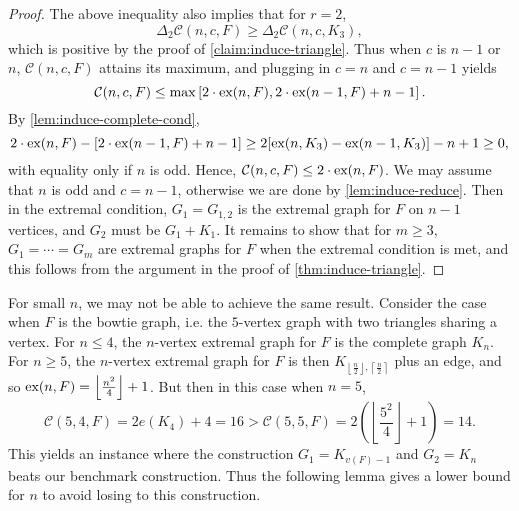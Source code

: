 \documentclass[12pt]{report}
\newtheorem{corollary}[theorem]{Corollary}
\newcommand*{\ex}{\textnormal{ex}}
\newcommand*{\dex}{\textnormal{ex}_2}
\newcommand*{\con}{\mathcal{C}}
\begin{document}
\begin{proof}
  The above inequality also implies that for $r = 2$,
  \[
    \Delta_2 \con(n, c, F) \geq \Delta_2 \con(n, c, K_3),
  \]
  which is positive by the proof of \cref{claim:induce-triangle}. Thus when $c$ is $n - 1$ or $n$, $\con(n, c, F)$ attains its maximum, and plugging in $c = n$ and $c = n -1$ yields 
  \[
    \con(n, c, F) \leq \max\left[2 \cdot \ex(n, F), 2 \cdot \ex(n - 1, F) + n - 1\right].
  \]
  By \cref{lem:induce-complete-cond},
  \[
    2 \cdot \ex(n, F) - [2 \cdot \ex(n - 1, F) + n - 1] \geq 2[\ex(n, K_{3}) - \ex(n - 1, K_{3})] - n + 1 \geq 0,
  \]
  with equality only if $n$ is odd. Hence, $\con(n, c, F) \leq 2 \cdot \ex(n, F)$. We may assume that $n$ is odd and $c = n - 1$, otherwise we are done by \cref{lem:induce-reduce}. Then in the extremal condition, $G_1 = G_{1, 2}$ is the extremal graph for $F$ on $n - 1$ vertices, and $G_2$ must be $G_1 + K_1$. It remains to show that for $m \geq 3$, $G_1 = \cdots = G_m$ are extremal graphs for $F$ when the extremal condition is met, and this follows from the argument in the proof of \cref{thm:induce-triangle}.
\end{proof}




For small $n$, we may not be able to achieve the same result. Consider the case when $F$ is the bowtie graph, i.e. the $5$-vertex graph with two triangles sharing a vertex. For $n \leq 4$, the $n$-vertex extremal graph for $F$ is the complete graph $K_n$. For $n \geq 5$, the $n$-vertex extremal graph for $F$ is then $K_{\left\lfloor\frac{n}{2}\right\rfloor, \left\lceil\frac{n}{2}\right\rceil}$ plus an edge, and so $\ex(n, F) = \left\lfloor\frac{n^2}{4}\right\rfloor + 1$. But then in this case when $n = 5$, 
\[
  \con(5, 4, F) = 2e(K_4) + 4 = 16 > \con(5, 5, F) = 2\left(\left\lfloor\frac{5^2}{4}\right\rfloor + 1\right) = 14.
\]
This yields an instance where the construction $G_1 = K_{v(F) - 1}$ and $G_2 = K_n$ beats our benchmark construction. Thus the following lemma gives a lower bound for $n$ to avoid losing to this construction.
\end{document}

